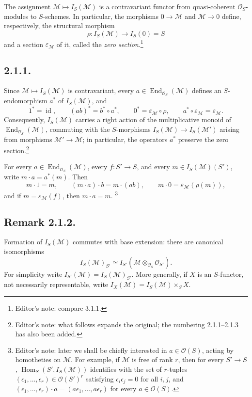 The assignment \(\mathcal M\mapsto I_S(\mathcal M)\) is a contravariant
functor from quasi-coherent \(\mathcal O_S\)-modules to \(S\)-schemes.
In particular, the morphisms \(0\to\mathcal M\) and
\(\mathcal M\to0\) define, respectively, the structural morphism
\[
  \rho:I_S(\mathcal M)\longrightarrow I_S(0)=S
\]
and a section \(\varepsilon_{\mathcal M}\) of it, called the
\emph{zero section}.\footnote{Editor's note: compare 3.1.1.}

\subsection*{2.1.1.}
Since \(\mathcal M\mapsto I_S(\mathcal M)\) is contravariant, every
\(a\in\operatorname{End}_{\mathcal O_S}(\mathcal M)\) defines an
\(S\)-endomorphism \(a^*\) of \(I_S(\mathcal M)\), and
\[
  1^*=\operatorname{id},\qquad (ab)^*=b^*\circ a^*,\qquad
  0^*=\varepsilon_{\mathcal M}\circ\rho,\qquad
  a^*\circ\varepsilon_{\mathcal M}=\varepsilon_{\mathcal M}.
\]
Consequently, \(I_S(\mathcal M)\) carries a right action of the
multiplicative monoid of
\(\operatorname{End}_{\mathcal O_S}(\mathcal M)\), commuting with the
\(S\)-morphisms \(I_S(\mathcal M)\to I_S(\mathcal M')\) arising from
morphisms \(\mathcal M'\to\mathcal M\); in particular, the operators
\(a^*\) preserve the zero section.\footnote{Editor's note: what follows
expands the original; the numbering 2.1.1--2.1.3 has also been added.}

For every \(a\in\operatorname{End}_{\mathcal O_S}(\mathcal M)\), every
\(f:S'\to S\), and every \(m\in I_S(\mathcal M)(S')\), write
\(m\cdot a=a^*(m)\). Then
\[
  m\cdot1=m,\qquad (m\cdot a)\cdot b=m\cdot(ab),\qquad
  m\cdot0=\varepsilon_{\mathcal M}(\rho(m)),
\]
and if \(m=\varepsilon_{\mathcal M}(f)\), then \(m\cdot a=m\).
\footnote{Editor's note: later we shall be chiefly interested in
\(a\in\mathcal O(S)\), acting by homotheties on \(\mathcal M\). For
example, if \(\mathcal M\) is free of rank \(r\), then for every
\(S'\to S\), \(\operatorname{Hom}_S(S',I_S(\mathcal M))\) identifies
with the set of \(r\)-tuples
\((\epsilon_1,\ldots,\epsilon_r)\in\mathcal O(S')^r\) satisfying
\(\epsilon_i\epsilon_j=0\) for all \(i,j\), and
\((\epsilon_1,\ldots,\epsilon_r)\cdot a
=(a\epsilon_1,\ldots,a\epsilon_r)\) for every \(a\in\mathcal O(S)\).}

\subsection*{Remark 2.1.2.}
Formation of \(I_S(\mathcal M)\) commutes with base extension: there are
canonical isomorphisms
\[
  I_S(\mathcal M)_{S'}
  \simeq I_{S'}(\mathcal M\otimes_{\mathcal O_S}\mathcal O_{S'}).
\]
For simplicity write \(I_{S'}(\mathcal M)=I_S(\mathcal M)_{S'}\). More
generally, if \(X\) is an \(S\)-functor, not necessarily representable,
write \(I_X(\mathcal M)=I_S(\mathcal M)\times_SX\).

